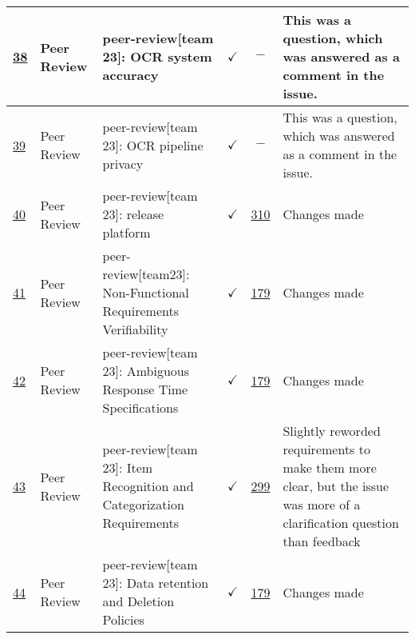 \documentclass{article}
\begin{document}
\begin{table}[H]
{\begin{tabular}{p{1.5cm} p{2cm} p{3.5cm} c c p{4cm}}
        \href{https://github.com/PlutosCapstone/Plutos/issues/38}{38} & Peer
        Review & peer-review[team 23]: OCR system accuracy & $\checkmark$ & $-$
        & This was a question, which was answered as a comment in the issue.  \\ \hline
        \href{https://github.com/PlutosCapstone/Plutos/issues/39}{39} & Peer
        Review & peer-review[team 23]: OCR pipeline privacy & $\checkmark$ & $-$ &
        This was a question, which was answered as a comment in the issue.  \\ \hline
        \href{https://github.com/PlutosCapstone/Plutos/issues/40}{40} & Peer
        Review & peer-review[team 23]: release platform & $\checkmark$
        & \href{https://github.com/PlutosCapstone/Plutos/pull/x}{310} & Changes made \\ \hline
        \href{https://github.com/PlutosCapstone/Plutos/issues/41}{41} & Peer
        Review & peer-review[team23]: Non-Functional Requirements Verifiability
        & $\checkmark$ & \href{https://github.com/PlutosCapstone/Plutos/pull/179}{179} &
        Changes made  \\ \hline
        \href{https://github.com/PlutosCapstone/Plutos/issues/42}{42} & Peer
        Review & peer-review[team 23]: Ambiguous Response Time Specifications  &
        $\checkmark$ &
        \href{https://github.com/PlutosCapstone/Plutos/pull/179}{179} & Changes
        made  \\ \hline
        \href{https://github.com/PlutosCapstone/Plutos/issues/43}{43} & Peer
        Review & peer-review[team 23]: Item Recognition and Categorization
        Requirements  & $\checkmark$ &
        \href{https://github.com/PlutosCapstone/Plutos/pull/299}{299} & Slightly
        reworded requirements to make them more clear, but the issue was more of
        a clarification question than feedback \\ \hline
        \href{https://github.com/PlutosCapstone/Plutos/issues/44}{44} & Peer
        Review & peer-review[team 23]: Data retention and Deletion Policies  & $\checkmark$ &
        \href{https://github.com/PlutosCapstone/Plutos/pull/179}{179} & Changes
        made \\
    \bottomrule
    \end{tabular}%
    }
\end{table}
\end{document}
